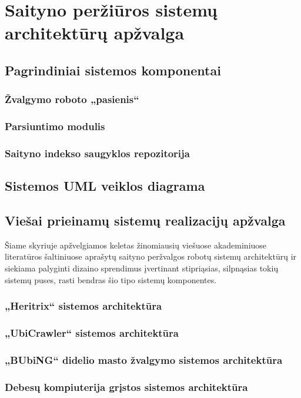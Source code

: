 \section{Saityno peržiūros sistemų architektūrų apžvalga}

\subsection{Pagrindiniai sistemos komponentai}

\subsubsection{Žvalgymo roboto „pasienis“}

\subsubsection{Parsiuntimo modulis}

\subsubsection{Saityno indekso saugyklos repozitorija}

\subsection{Sistemos UML veiklos diagrama}



\subsection{Viešai prieinamų sistemų realizacijų apžvalga}

Šiame skyriuje apžvelgiamos keletas žinomiausių viešuose akademiniuose literatūros šaltiniuose aprašytų saityno peržvalgos robotų sistemų architektūrų ir siekiama palyginti dizaino sprendimus įvertinant stipriąsias, silpnąsias tokių sistemų puses, rasti bendras šio tipo sistemų komponentes.



\subsubsection{„Heritrix“ sistemos architektūra}
\subsubsection{„UbiCrawler“ sistemos architektūra}
\subsubsection{„BUbiNG“ didelio masto žvalgymo sistemos architektūra}
\subsubsection{Debesų kompiuterija grįstos sistemos architektūra}